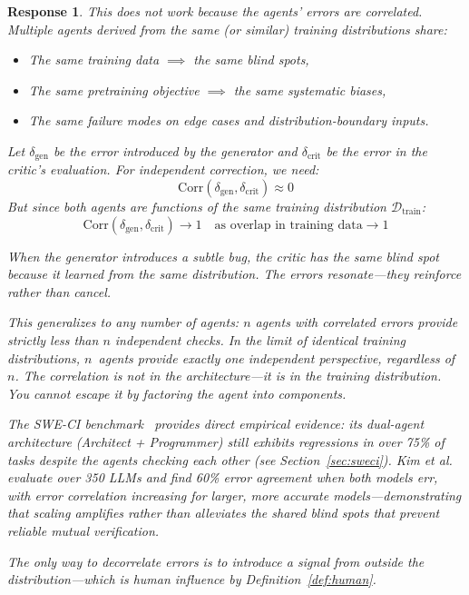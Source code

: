 \documentclass[11pt,a4paper]{article}
\newtheorem{response}{Response}
\begin{document}
\begin{response}
This does not work because the agents' errors are correlated. Multiple agents derived from the same (or similar) training distributions share:
\begin{itemize}
    \item The same training data $\implies$ the same blind spots,
    \item The same pretraining objective $\implies$ the same systematic biases,
    \item The same failure modes on edge cases and distribution-boundary inputs.
\end{itemize}

Let $\delta_{\mathrm{gen}}$ be the error introduced by the generator and $\delta_{\mathrm{crit}}$ be the error in the critic's evaluation. For independent correction, we need:
\begin{equation}
\mathrm{Corr}(\delta_{\mathrm{gen}}, \delta_{\mathrm{crit}}) \approx 0
\end{equation}
But since both agents are functions of the same training distribution $\mathcal{D}_{\mathrm{train}}$:
\begin{equation}
\mathrm{Corr}(\delta_{\mathrm{gen}}, \delta_{\mathrm{crit}}) \to 1 \quad \text{as overlap in training data} \to 1
\end{equation}

When the generator introduces a subtle bug, the critic has the same blind spot because it learned from the same distribution. The errors \emph{resonate}---they reinforce rather than cancel.

This generalizes to any number of agents: $n$ agents with correlated errors provide strictly less than $n$ independent checks. In the limit of identical training distributions, $n$~agents provide exactly one independent perspective, regardless of~$n$. The correlation is not in the architecture---it is in the training distribution. You cannot escape it by factoring the agent into components.

The SWE-CI benchmark~\cite{chen2025sweci} provides direct empirical evidence: its dual-agent architecture (Architect + Programmer) still exhibits regressions in over 75\% of tasks despite the agents checking each other (see Section~\ref{sec:sweci}). Kim et al.~\cite{kim2025correlated} evaluate over 350 LLMs and find 60\% error agreement when both models err, with error correlation \emph{increasing} for larger, more accurate models---demonstrating that scaling amplifies rather than alleviates the shared blind spots that prevent reliable mutual verification.

The only way to decorrelate errors is to introduce a signal from outside the distribution---which is human influence by Definition~\ref{def:human}.
\end{response}
\end{document}
